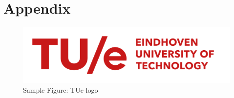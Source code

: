 \section{Appendix}
\begin{figure}[H]
    \centering
    \includegraphics[width=0.9\linewidth]{Figures/tuelogo.png}
    \caption{Sample Figure: TUe logo}
    \label{fig A}
\end{figure}